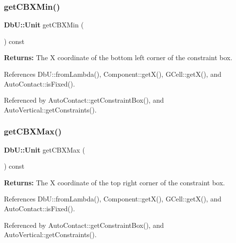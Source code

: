 \subsubsection{\texorpdfstring{get\+C\+B\+X\+Min()}{getCBXMin()}}
{\footnotesize\ttfamily \textbf{ Db\+U\+::\+Unit} get\+C\+B\+X\+Min (\begin{DoxyParamCaption}{ }\end{DoxyParamCaption}) const\hspace{0.3cm}{\ttfamily [inline]}}

{\bfseries Returns\+:} The X coordinate of the bottom left corner of the constraint box. 

References Db\+U\+::from\+Lambda(), Component\+::get\+X(), G\+Cell\+::get\+X(), and Auto\+Contact\+::is\+Fixed().



Referenced by Auto\+Contact\+::get\+Constraint\+Box(), and Auto\+Vertical\+::get\+Constraints().

\mbox{\label{classKatabatic_1_1AutoContact_a798750f964050c53c269a2e56d44b690}} 
\subsubsection{\texorpdfstring{get\+C\+B\+X\+Max()}{getCBXMax()}}
{\footnotesize\ttfamily \textbf{ Db\+U\+::\+Unit} get\+C\+B\+X\+Max (\begin{DoxyParamCaption}{ }\end{DoxyParamCaption}) const\hspace{0.3cm}{\ttfamily [inline]}}

{\bfseries Returns\+:} The X coordinate of the top right corner of the constraint box. 

References Db\+U\+::from\+Lambda(), Component\+::get\+X(), G\+Cell\+::get\+X(), and Auto\+Contact\+::is\+Fixed().



Referenced by Auto\+Contact\+::get\+Constraint\+Box(), and Auto\+Vertical\+::get\+Constraints().

\mbox{\label{classKatabatic_1_1AutoContact_ad7ee1befb03ee85f237a36e2f5ab8e45}} 
